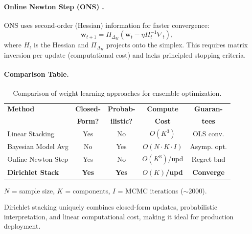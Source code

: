\paragraph{Online Newton Step (ONS) \citep{hazan2007}.}
ONS uses second-order (Hessian) information for faster convergence:
\begin{equation}
\mathbf{w}_{t+1} = \Pi_{\Delta_K}\left(\mathbf{w}_t - \eta H_t^{-1} \nabla_t\right),
\end{equation}
where $H_t$ is the Hessian and $\Pi_{\Delta_K}$ projects onto the simplex. This requires matrix inversion per update (computational cost) and lacks principled stopping criteria.

\paragraph{Comparison Table.}
\begin{table}[htbp]
\centering
\small
\caption[Comparison of ensemble weight learning methods]{Comparison of weight learning approaches for ensemble optimization.}
\label{tab:weight-learning-comparison}
\begin{threeparttable}
\begin{tabular}{@{}lcccc@{}}
\toprule
\textbf{Method} & \textbf{Closed-} & \textbf{Probab-} & \textbf{Compute} & \textbf{Guaran-} \\
 & \textbf{Form?} & \textbf{ilistic?} & \textbf{Cost} & \textbf{tees} \\
\midrule
Linear Stacking & Yes & No & $O(K^3)$ & OLS conv. \\
Bayesian Model Avg & No & Yes & $O(N \cdot K \cdot I)$\tnote{a} & Asymp. opt. \\
Online Newton Step & Yes & No & $O(K^3)$/upd & Regret bnd \\
\textbf{Dirichlet Stack} & \textbf{Yes} & \textbf{Yes} & \textbf{$O(K)$/upd} & \textbf{Converge} \\
\bottomrule
\end{tabular}
\begin{tablenotes}
\footnotesize
\item[a] $N$ = sample size, $K$ = components, $I$ = MCMC iterations ($\sim$2000).
\end{tablenotes}
\end{threeparttable}
\end{table}

Dirichlet stacking uniquely combines closed-form updates, probabilistic interpretation, and linear computational cost, making it ideal for production deployment.

